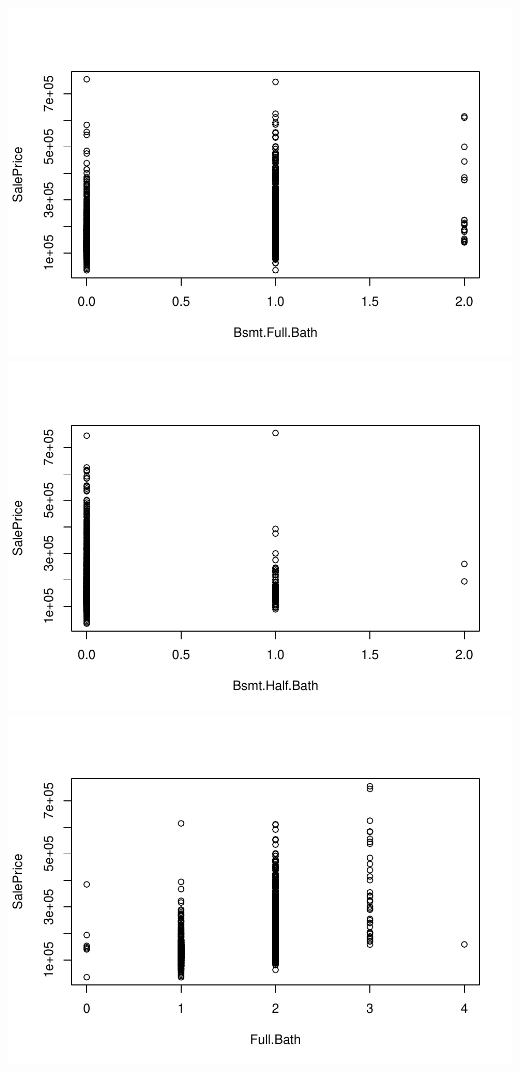 \documentclass[
]{article}
\begin{document}
\includegraphics{Predicting-Housing-Price_files/figure-latex/unnamed-chunk-2-16.pdf}
\includegraphics{Predicting-Housing-Price_files/figure-latex/unnamed-chunk-2-17.pdf}
\includegraphics{Predicting-Housing-Price_files/figure-latex/unnamed-chunk-2-18.pdf}
\end{document}
